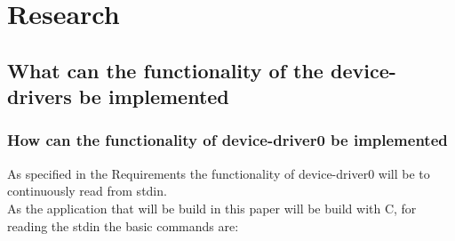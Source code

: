 \hypertarget{research}{%
\section{Research}\label{research}}

\hypertarget{what-can-the-functionality-of-the-device-drivers-be-implemented}{%
\subsection{What can the functionality of the device-drivers be
implemented}\label{what-can-the-functionality-of-the-device-drivers-be-implemented}}

\hypertarget{how-can-the-functionality-of-device-driver0-be-implemented}{%
\subsubsection{How can the functionality of device-driver0 be
implemented}\label{how-can-the-functionality-of-device-driver0-be-implemented}}

As specified in the Requirements the functionality of device-driver0
will be to continuously read from stdin.\\
As the application that will be build in this paper will be build with
C, for reading the stdin the basic commands are:

